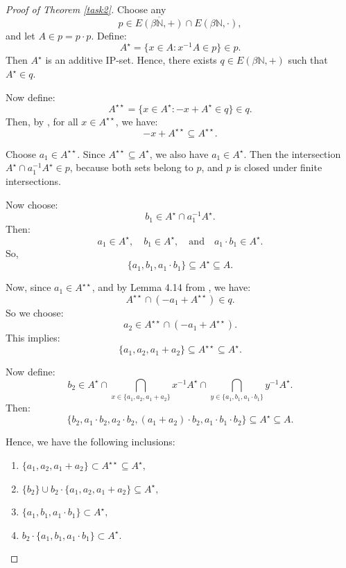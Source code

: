 \documentclass{article}
\theoremstyle{Theorem}
\theoremstyle{definition}
\begin{document}
\begin{proof}[Proof of Theorem \ref{task2}]
Choose any 
\[
p \in \overline{E\left(\beta \mathbb{N},+\right)} \cap E\left(\beta \mathbb{N},\cdot\right),
\]
and let \( A \in p = p \cdot p \). Define:
\[
A^\star = \{x \in A : x^{-1}A \in p\} \in p.
\]
Then \( A^\star \) is an additive \( \text{IP} \)-set. Hence, there exists \( q \in E(\beta \mathbb{N}, +) \) such that \( A^\star \in q \).

Now define:
\[
A^{\star \star} = \{x \in A^\star : -x + A^\star \in q \} \in q.
\]
Then, by \cite[Lemma 4.14]{book}, for all \( x \in A^{\star \star} \), we have:
\[
-x + A^{\star \star} \subseteq A^{\star \star}.
\]



Choose \( a_1 \in A^{\star \star} \). Since \( A^{\star \star} \subseteq A^\star \), we also have \( a_1 \in A^\star \). 
Then the intersection \( A^\star \cap a_1^{-1}A^\star \in p \), because both sets belong to \( p \), and \( p \) is closed under finite intersections.

Now choose:
\[
b_1 \in A^\star \cap a_1^{-1}A^\star.
\]
Then:
\[
a_1 \in A^\star, \quad b_1 \in A^\star, \quad \text{and} \quad a_1 \cdot b_1 \in A^\star.
\]
So,
\[
\{a_1, b_1, a_1 \cdot b_1\} \subseteq A^\star \subseteq A.
\]




Now, since \( a_1 \in A^{\star \star} \), and by Lemma 4.14 from \cite{book}, we have:
\[
A^{\star \star} \cap (-a_1 + A^{\star \star}) \in q.
\]
So we choose:
\[
a_2 \in A^{\star \star} \cap (-a_1 + A^{\star \star}).
\]
This implies:
\[
\{a_1, a_2, a_1 + a_2\} \subseteq A^{\star \star} \subseteq A^\star.
\]

Now define:
\[
b_2 \in A^\star \cap \bigcap_{x \in \{a_1, a_2, a_1 + a_2\}} x^{-1}A^\star \cap \bigcap_{y \in \{a_1, b_1, a_1 \cdot b_1\}} y^{-1}A^\star.
\]
Then:
\[
\{b_2, a_1 \cdot b_2, a_2 \cdot b_2, (a_1 + a_2) \cdot b_2, a_1 \cdot b_1 \cdot b_2\} \subseteq A^\star \subseteq A.
\]



Hence, we have the following inclusions:

\begin{enumerate}
    \item \( \{a_1, a_2, a_1 + a_2\} \subset A^{\star \star} \subseteq A^\star, \)
    \item \( \{b_2\} \cup b_2 \cdot \{a_1, a_2, a_1 + a_2\} \subseteq A^\star, \)
    \item \( \{a_1, b_1, a_1 \cdot b_1\} \subset A^\star, \)
    \item \( b_2 \cdot \{a_1, b_1, a_1 \cdot b_1\} \subset A^\star. \)
\end{enumerate}



\end{proof}
\end{document}
